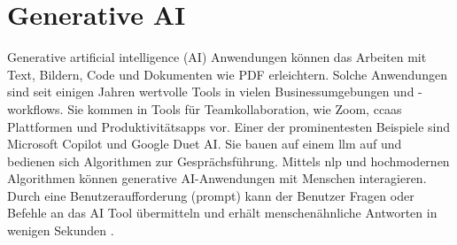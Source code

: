 \section{Generative AI}
Generative artificial intelligence (AI) Anwendungen können das Arbeiten mit Text, Bildern, Code und Dokumenten wie PDF erleichtern. Solche Anwendungen sind seit einigen Jahren wertvolle Tools in vielen Businessumgebungen und -workflows. Sie kommen in Tools für Teamkollaboration, wie Zoom, \gls{ccaas} Plattformen und Produktivitätsapps vor. Einer der prominentesten Beispiele sind Microsoft Copilot und Google Duet AI. Sie bauen auf einem \gls{llm} auf und bedienen sich Algorithmen zur Gesprächsführung. Mittels \gls{nlp} und hochmodernen Algorithmen können generative AI-Anwendungen mit Menschen interagieren. Durch eine Benutzeraufforderung (prompt) kann der Benutzer Fragen oder Befehle an das AI Tool übermitteln und erhält menschenähnliche Antworten in wenigen Sekunden \cite{copilot-duet}.

